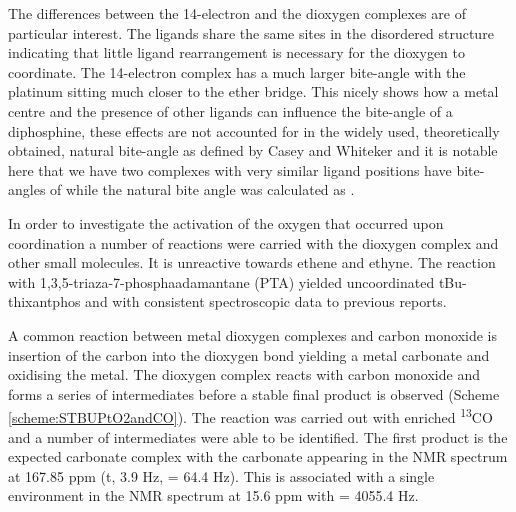 
The differences between the 14-electron and the dioxygen complexes are of particular interest.  The ligands share the same sites in the disordered structure indicating that little ligand rearrangement is necessary for the dioxygen to coordinate.  The 14-electron complex has a much larger bite-angle  with the platinum sitting much closer to the ether bridge.  This nicely shows how a metal centre and the presence of other ligands can influence the bite-angle of a diphosphine, these effects are not accounted for in the widely used, theoretically obtained, natural bite-angle as defined by Casey and Whiteker\cite{Casey1990} and it is notable here that we have two complexes with very similar ligand positions have bite-angles of  while the natural bite angle was calculated as .



In order to investigate the activation of the oxygen that occurred upon coordination a number of reactions were carried with the dioxygen complex and other small molecules.  It is unreactive towards ethene and ethyne.  The reaction with 1,3,5-triaza-7-phosphaadamantane (PTA) yielded uncoordinated tBu-thixantphos and \ce{[Pt(PTA)4]} with consistent spectroscopic data to previous reports. 

A common reaction between metal dioxygen complexes and carbon monoxide is insertion of the carbon into the dioxygen bond yielding a metal carbonate and oxidising the metal.\cite{Goel1983b}  The dioxygen complex  reacts with carbon monoxide and forms a series of intermediates before a stable final product is observed (Scheme \ref{scheme:STBUPtO2andCO}).  The reaction was carried out with enriched \textsuperscript{13}CO and a number of intermediates were able to be identified.  The first product is the expected carbonate complex   with the carbonate appearing in the \carbon{} NMR spectrum at 167.85 ppm (t, 3.9 Hz, \JPtC{} = 64.4 Hz).  This is associated with a single environment in the \phosphorus{} NMR spectrum at 15.6 ppm with \JPtP{} = 4055.4 Hz.

